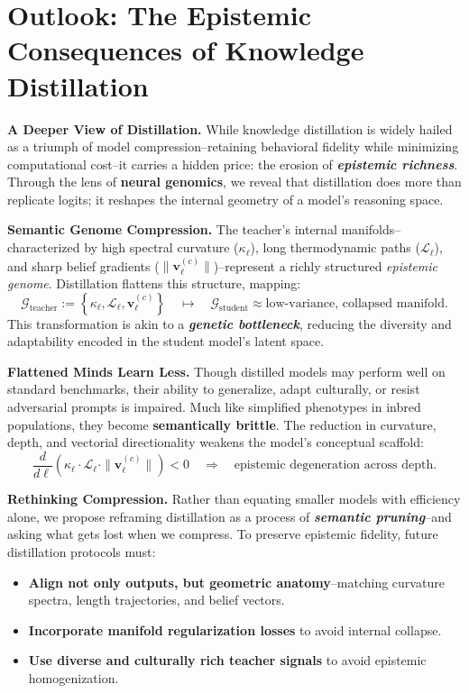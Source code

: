 \section*{Outlook: The Epistemic Consequences of Knowledge Distillation}

\vspace{0.5em}
\noindent \textbf{A Deeper View of Distillation.} While knowledge distillation is widely hailed as a triumph of model compression--retaining behavioral fidelity while minimizing computational cost--it carries a hidden price: the erosion of \textbf{\emph{epistemic richness}}. Through the lens of \textbf{neural genomics}, we reveal that distillation does more than replicate logits; it reshapes the internal geometry of a model’s reasoning space.

\vspace{0.5em}
\noindent \textbf{Semantic Genome Compression.} The teacher’s internal manifolds--characterized by high spectral curvature ($\kappa_\ell$), long thermodynamic paths ($\mathcal{L}_\ell$), and sharp belief gradients ($\|\mathbf{v}_\ell^{(c)}\|$)--represent a richly structured \emph{epistemic genome}. Distillation flattens this structure, mapping:
\[
\mathcal{G}_{\text{teacher}} := \left\{ \kappa_\ell, \mathcal{L}_\ell, \mathbf{v}_\ell^{(c)} \right\}
\quad \longmapsto \quad
\mathcal{G}_{\text{student}} \approx \text{low-variance, collapsed manifold}.
\]
This transformation is akin to a \textbf{\emph{genetic bottleneck}}, reducing the diversity and adaptability encoded in the student model’s latent space.

\vspace{0.5em}
\noindent \textbf{Flattened Minds Learn Less.} Though distilled models may perform well on standard benchmarks, their ability to generalize, adapt culturally, or resist adversarial prompts is impaired. Much like simplified phenotypes in inbred populations, they become \textbf{semantically brittle}. The reduction in curvature, depth, and vectorial directionality weakens the model’s conceptual scaffold:
\[
\frac{d}{d\ell} \left( \kappa_\ell \cdot \mathcal{L}_\ell \cdot \| \mathbf{v}_\ell^{(c)} \| \right) < 0
\quad \Rightarrow \quad \text{epistemic degeneration across depth}.
\]

\vspace{0.5em}
\noindent \textbf{Rethinking Compression.} Rather than equating smaller models with efficiency alone, we propose reframing distillation as a process of \textbf{\emph{semantic pruning}}--and asking what gets lost when we compress. To preserve epistemic fidelity, future distillation protocols must:
\begin{itemize}[leftmargin=1.5em]
    \item \textbf{Align not only outputs, but geometric anatomy}--matching curvature spectra, length trajectories, and belief vectors.
    \item \textbf{Incorporate manifold regularization losses} to avoid internal collapse.
    \item \textbf{Use diverse and culturally rich teacher signals} to avoid epistemic homogenization.
\end{itemize}


